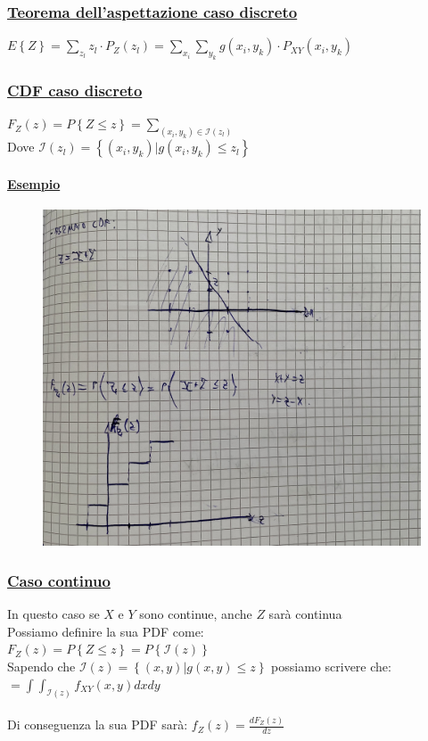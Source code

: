 \documentclass{article}
\begin{document}
\subsubsection{\underline{Teorema dell’aspettazione caso discreto}}
$E\left\{ Z \right\} = \sum_{z_l} z_l \cdot P_Z(z_l) = \sum_{x_i}\sum_{y_k} g(x_i,y_k) \cdot P_{XY}(x_i,y_k)$
\subsubsection{\underline{CDF caso discreto}}
$F_Z(z) = P\left\{ Z \leq z \right\} = \sum_{(x_i,y_k) \in \mathcal{I}(z_l)}$ \\
Dove $\mathcal{I}(z_l) = \left\{ (x_i,y_k) | g(x_i,y_k) \leq z_l \right\} $
\paragraph{\underline{Esempio}}
\begin{figure}[ht]
\centering
\includegraphics[scale=0.14]{ese/46.jpeg}
\end{figure} 
\subsubsection{\underline{Caso continuo}}
In questo caso se $X$ e $Y$ sono continue, anche $Z$ sarà continua \\
Possiamo definire la sua PDF come: \\
$F_Z(z) = P \left\{ Z \leq z \right\} = P\left\{ \mathcal{I}(z) \right\}$ \\
Sapendo che $\mathcal{I}(z) = \left\{ (x,y) | g(x,y) \leq z \right\}$ possiamo scrivere che: \\
$= \int \int_{\mathcal{I}(z)} f_{XY}(x,y) dx dy$ \\ \\
Di conseguenza la sua PDF sarà: $f_Z(z) = \frac{dF_Z(z)}{dz}$ 
\end{document}
